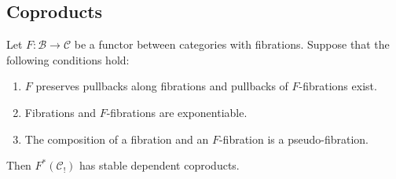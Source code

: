 \documentclass[reqno]{amsart}
\theoremstyle{definition}
\theoremstyle{remark}
\newcommand{\scat}[1]{\mathcal{#1}}
\numberwithin{figure}{section}
\begin{document}
\subsection{Coproducts}

\begin{prop}[coproducts]
Let $F : \scat{B} \to \scat{C}$ be a functor between categories with fibrations.
Suppose that the following conditions hold:
\begin{enumerate}
\item $F$ preserves pullbacks along fibrations and pullbacks of $F$-fibrations exist.
\item Fibrations and $F$-fibrations are exponentiable.
\item The composition of a fibration and an $F$-fibration is a pseudo-fibration.
\end{enumerate}
Then $F^*(\scat{C}_!)$ has stable dependent coproducts.
\end{prop}
\end{document}
